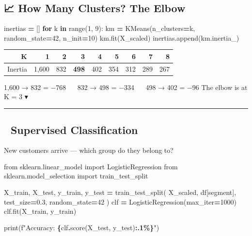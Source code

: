 \documentclass[
]{article}
\newenvironment{Shaded}{\begin{snugshade}}{\end{snugshade}}
\newcommand{\BuiltInTok}[1]{#1}
\newcommand{\ControlFlowTok}[1]{\textcolor[rgb]{0.13,0.29,0.53}{\textbf{#1}}}
\newcommand{\DecValTok}[1]{\textcolor[rgb]{0.00,0.00,0.81}{#1}}
\newcommand{\FloatTok}[1]{\textcolor[rgb]{0.00,0.00,0.81}{#1}}
\newcommand{\ImportTok}[1]{#1}
\newcommand{\KeywordTok}[1]{\textcolor[rgb]{0.13,0.29,0.53}{\textbf{#1}}}
\newcommand{\NormalTok}[1]{#1}
\newcommand{\OperatorTok}[1]{\textcolor[rgb]{0.81,0.36,0.00}{\textbf{#1}}}
\newcommand{\SpecialCharTok}[1]{\textcolor[rgb]{0.81,0.36,0.00}{\textbf{#1}}}
\newcommand{\SpecialStringTok}[1]{\textcolor[rgb]{0.31,0.60,0.02}{#1}}
\newcommand{\StringTok}[1]{\textcolor[rgb]{0.31,0.60,0.02}{#1}}
\begin{document}
\subsection{📈 How Many Clusters? The
Elbow}\label{how-many-clusters-the-elbow}

\begin{Shaded}
\begin{Highlighting}[]
\NormalTok{inertias }\OperatorTok{=}\NormalTok{ []}
\ControlFlowTok{for}\NormalTok{ k }\KeywordTok{in} \BuiltInTok{range}\NormalTok{(}\DecValTok{1}\NormalTok{, }\DecValTok{9}\NormalTok{):}
\NormalTok{    km }\OperatorTok{=}\NormalTok{ KMeans(n\_clusters}\OperatorTok{=}\NormalTok{k, random\_state}\OperatorTok{=}\DecValTok{42}\NormalTok{, n\_init}\OperatorTok{=}\DecValTok{10}\NormalTok{)}
\NormalTok{    km.fit(X\_scaled)}
\NormalTok{    inertias.append(km.inertia\_)}
\end{Highlighting}
\end{Shaded}

\begin{longtable}[]{@{}rrrrrrrrr@{}}
\toprule\noalign{}
K & 1 & 2 & \textbf{3} & 4 & 5 & 6 & 7 & 8 \\
\midrule\noalign{}
\endhead
\bottomrule\noalign{}
\endlastfoot
Inertia & 1,600 & 832 & \textbf{498} & 402 & 354 & 312 & 289 & 267 \\
\end{longtable}

1,600 → 832 = −768 ~\textbar~ 832 → 498 = −334 ~\textbar~ 498 → 402 =
−96 {The elbow is at K = 3 ▾}

\begin{center}\rule{0.5\linewidth}{0.5pt}\end{center}

\subsection{🎯 Supervised
Classification}\label{supervised-classification}

New customers arrive --- which group do they belong to?

\begin{Shaded}
\begin{Highlighting}[]
\ImportTok{from}\NormalTok{ sklearn.linear\_model }\ImportTok{import}\NormalTok{ LogisticRegression}
\ImportTok{from}\NormalTok{ sklearn.model\_selection }\ImportTok{import}\NormalTok{ train\_test\_split}

\NormalTok{X\_train, X\_test, y\_train, y\_test }\OperatorTok{=}\NormalTok{ train\_test\_split(}
\NormalTok{    X\_scaled, df[}\StringTok{\textquotesingle{}segment\textquotesingle{}}\NormalTok{], test\_size}\OperatorTok{=}\FloatTok{0.3}\NormalTok{, random\_state}\OperatorTok{=}\DecValTok{42}
\NormalTok{)}
\NormalTok{clf }\OperatorTok{=}\NormalTok{ LogisticRegression(max\_iter}\OperatorTok{=}\DecValTok{1000}\NormalTok{)}
\NormalTok{clf.fit(X\_train, y\_train)}

\BuiltInTok{print}\NormalTok{(}\SpecialStringTok{f"Accuracy: }\SpecialCharTok{\{}\NormalTok{clf}\SpecialCharTok{.}\NormalTok{score(X\_test, y\_test)}\SpecialCharTok{:.1\%\}}\SpecialStringTok{"}\NormalTok{)}
\end{Highlighting}
\end{Shaded}
\end{document}
